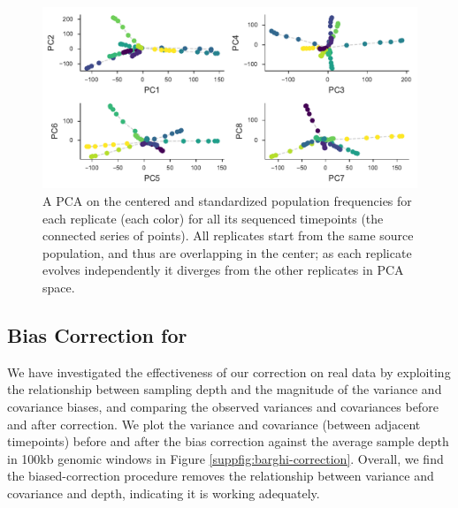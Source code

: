 \documentclass[11pt]{article}
\begin{document}
\begin{figure}[!ht]
  \centering

  \includegraphics[]{figures/barghi-panel-pca.pdf}

  \caption{A PCA on the centered and standardized population frequencies for
  each replicate (each color) for all its sequenced timepoints (the connected
  series of points). All replicates start from the same source population, and
  thus are overlapping in the center; as each replicate evolves independently it
  diverges from the other replicates in PCA space.}
  
  \label{suppfig:barghi-pca}
\end{figure}

\subsection{Bias Correction for \textcite{Barghi2019-qy}}

We have investigated the effectiveness of our correction on real data by
exploiting the relationship between sampling depth and the magnitude of the
variance and covariance biases, and comparing the observed variances and
covariances before and after correction. We plot the variance and covariance
(between adjacent timepoints) before and after the bias correction against the
average sample depth in 100kb genomic windows in Figure
\ref{suppfig:barghi-correction}. Overall, we find the biased-correction
procedure removes the relationship between variance and covariance and depth, indicating it is working adequately.
\end{document}
